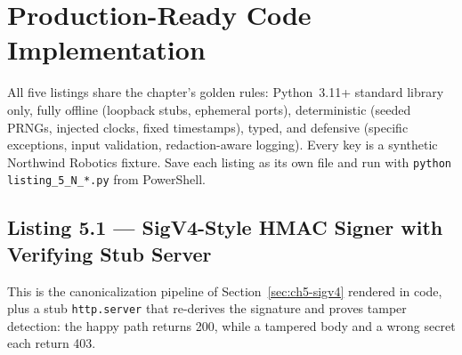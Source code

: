 \section{Production-Ready Code Implementation}
\label{sec:ch5-code}

All five listings share the chapter's golden rules: Python~3.11+ standard
library only, fully offline (loopback stubs, ephemeral ports), deterministic
(seeded PRNGs, injected clocks, fixed timestamps), typed, and defensive
(specific exceptions, input validation, redaction-aware logging). Every key
is a synthetic Northwind Robotics fixture. Save each listing as its own file
and run with \texttt{python listing\_5\_N\_*.py} from PowerShell.

\subsection{Listing 5.1 --- SigV4-Style HMAC Signer with Verifying Stub Server}
\label{lst:hmac}

This is the canonicalization pipeline of Section~\ref{sec:ch5-sigv4}
rendered in code, plus a stub \texttt{http.server} that re-derives the
signature and proves tamper detection: the happy path returns 200, while a
tampered body and a wrong secret each return 403.

